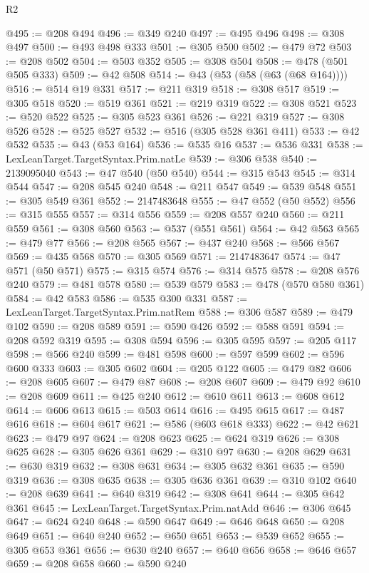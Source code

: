 \begin{lexlean}{R2}
\begin{coremodule}
@495 := @208 @494
@496 := @349 @240
@497 := @495 @496
@498 := @308 @497
@500 := @493 @498 @333
@501 := @305 @500
@502 := @479 @72
@503 := @208 @502
@504 := @503 @352
@505 := @308 @504
@508 := @478 (@501 @505 @333)
@509 := @42 @508
@514 := @43 (@53 (@58 (@63 (@68 @164))))
@516 := @514 @19 @331
@517 := @211 @319
@518 := @308 @517
@519 := @305 @518
@520 := @519 @361
@521 := @219 @319
@522 := @308 @521
@523 := @520 @522
@525 := @305 @523 @361
@526 := @221 @319
@527 := @308 @526
@528 := @525 @527
@532 := @516 (@305 @528 @361 @411)
@533 := @42 @532
@535 := @43 (@53 @164)
@536 := @535 @16
@537 := @536 @331
@538 := LexLeanTarget.TargetSyntax.Prim.natLe
@539 := @306 @538
@540 := 2139095040
@543 := @47 @540 (@50 @540)
@544 := @315 @543
@545 := @314 @544
@547 := @208 @545 @240
@548 := @211 @547
@549 := @539 @548
@551 := @305 @549 @361
@552 := 2147483648
@555 := @47 @552 (@50 @552)
@556 := @315 @555
@557 := @314 @556
@559 := @208 @557 @240
@560 := @211 @559
@561 := @308 @560
@563 := @537 (@551 @561)
@564 := @42 @563
@565 := @479 @77
@566 := @208 @565
@567 := @437 @240
@568 := @566 @567
@569 := @435 @568
@570 := @305 @569
@571 := 2147483647
@574 := @47 @571 (@50 @571)
@575 := @315 @574
@576 := @314 @575
@578 := @208 @576 @240
@579 := @481 @578
@580 := @539 @579
@583 := @478 (@570 @580 @361)
@584 := @42 @583
@586 := @535 @300 @331
@587 := LexLeanTarget.TargetSyntax.Prim.natRem
@588 := @306 @587
@589 := @479 @102
@590 := @208 @589
@591 := @590 @426
@592 := @588 @591
@594 := @208 @592 @319
@595 := @308 @594
@596 := @305 @595
@597 := @205 @117
@598 := @566 @240
@599 := @481 @598
@600 := @597 @599
@602 := @596 @600 @333
@603 := @305 @602
@604 := @205 @122
@605 := @479 @82
@606 := @208 @605
@607 := @479 @87
@608 := @208 @607
@609 := @479 @92
@610 := @208 @609
@611 := @425 @240
@612 := @610 @611
@613 := @608 @612
@614 := @606 @613
@615 := @503 @614
@616 := @495 @615
@617 := @487 @616
@618 := @604 @617
@621 := @586 (@603 @618 @333)
@622 := @42 @621
@623 := @479 @97
@624 := @208 @623
@625 := @624 @319
@626 := @308 @625
@628 := @305 @626 @361
@629 := @310 @97
@630 := @208 @629
@631 := @630 @319
@632 := @308 @631
@634 := @305 @632 @361
@635 := @590 @319
@636 := @308 @635
@638 := @305 @636 @361
@639 := @310 @102
@640 := @208 @639
@641 := @640 @319
@642 := @308 @641
@644 := @305 @642 @361
@645 := LexLeanTarget.TargetSyntax.Prim.natAdd
@646 := @306 @645
@647 := @624 @240
@648 := @590 @647
@649 := @646 @648
@650 := @208 @649
@651 := @640 @240
@652 := @650 @651
@653 := @539 @652
@655 := @305 @653 @361
@656 := @630 @240
@657 := @640 @656
@658 := @646 @657
@659 := @208 @658
@660 := @590 @240

\end{coremodule}
\end{lexlean}
